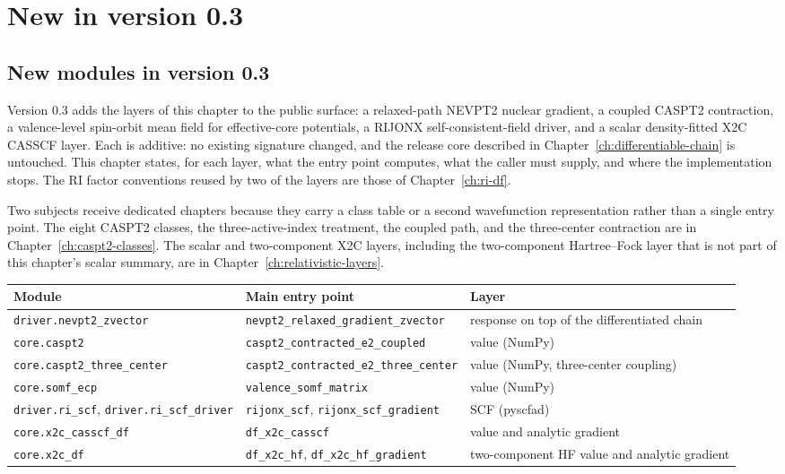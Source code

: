\part{New in version 0.3}
\chapter{New modules in version 0.3}
\label{ch:new-modules}

Version 0.3 adds the layers of this chapter to the public surface: a
relaxed-path NEVPT2 nuclear gradient, a coupled CASPT2 contraction, a
valence-level spin-orbit mean field for effective-core potentials, a
RIJONX self-consistent-field driver, and a scalar density-fitted X2C
CASSCF layer.  Each is additive: no existing signature changed, and the
release core described in Chapter~\ref{ch:differentiable-chain} is
untouched.  This chapter states, for each layer, what the entry point
computes, what the caller must supply, and where the implementation
stops.  The RI factor conventions reused by two of the layers are those
of Chapter~\ref{ch:ri-df}.

Two subjects receive dedicated chapters because they carry a class
table or a second wavefunction representation rather than a single
entry point.  The eight CASPT2 classes, the three-active-index
treatment, the coupled path, and the three-center contraction are in
Chapter~\ref{ch:caspt2-classes}.  The scalar and two-component X2C
layers, including the two-component Hartree--Fock layer that is not
part of this chapter's scalar summary, are in
Chapter~\ref{ch:relativistic-layers}.

\begin{center}
\small
\begin{tabularx}{\textwidth}{>{\raggedright\arraybackslash}p{}>{\raggedright\arraybackslash}p{}X}
\toprule
Module & Main entry point & Layer \\
\midrule
\texttt{driver.nevpt2\_zvector} &
  \texttt{nevpt2\_relaxed\_gradient\_zvector} &
  response on top of the differentiated chain \\
\texttt{core.caspt2} &
  \texttt{caspt2\_contracted\_e2\_coupled} &
  value (NumPy) \\
\texttt{core.caspt2\_three\_center} &
  \texttt{caspt2\_contracted\_e2\_\allowbreak three\_center} &
  value (NumPy, three-center coupling) \\
\texttt{core.somf\_ecp} &
  \texttt{valence\_somf\_matrix} &
  value (NumPy) \\
\texttt{driver.ri\_scf}, \texttt{driver.ri\_scf\_driver} &
  \texttt{rijonx\_scf}, \texttt{rijonx\_scf\_gradient} &
  SCF (pyscfad) \\
\texttt{core.x2c\_casscf\_df} &
  \texttt{df\_x2c\_casscf} &
  value and analytic gradient \\
\texttt{core.x2c\_df} &
  \texttt{df\_x2c\_hf}, \texttt{df\_x2c\_hf\_gradient} &
  two-component HF value and analytic gradient \\
\bottomrule
\end{tabularx}
\end{center}

